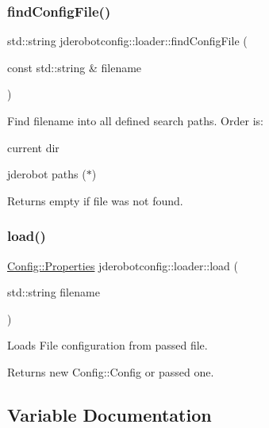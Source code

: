 \subsubsection{\texorpdfstring{find\+Config\+File()}{findConfigFile()}}
{\footnotesize\ttfamily std\+::string jderobotconfig\+::loader\+::find\+Config\+File (\begin{DoxyParamCaption}\item[{const std\+::string \&}]{filename }\end{DoxyParamCaption})}



Find filename into all defined search paths. Order is\+: 


\begin{DoxyEnumerate}
\item current dir
\item jderobot paths ($\ast$)
\end{DoxyEnumerate}

\begin{DoxyReturn}{Returns}
empty if file was not found. 
\end{DoxyReturn}
\mbox{\label{namespacejderobotconfig_1_1loader_a20d680d49aae952308a601aefca96fa4}} 
\subsubsection{\texorpdfstring{load()}{load()}}
{\footnotesize\ttfamily \hyperlink{class_config_1_1_properties}{Config\+::\+Properties} jderobotconfig\+::loader\+::load (\begin{DoxyParamCaption}\item[{std\+::string}]{filename }\end{DoxyParamCaption})}



Loads File configuration from passed file. 

\begin{DoxyReturn}{Returns}
new Config\+::\+Config or passed one. 
\end{DoxyReturn}


\subsection{Variable Documentation}
\mbox{\label{namespacejderobotconfig_1_1loader_a5b2c5f0990c440ef22a49c12951c6969}} 
